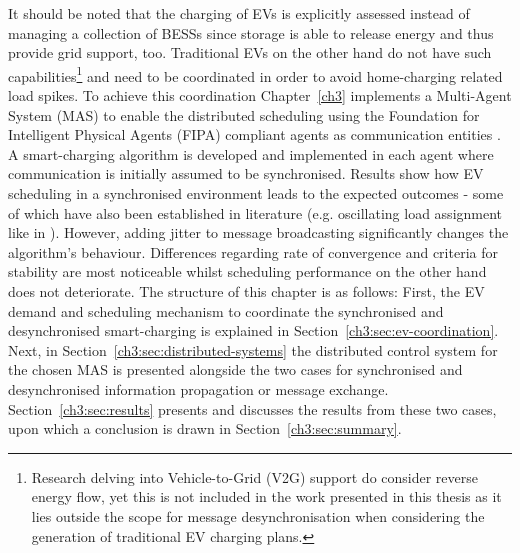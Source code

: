It should be noted that the charging of EVs is explicitly assessed instead of managing a collection of BESSs since storage is able to release energy and thus provide grid support, too.
Traditional EVs on the other hand do not have such capabilities\footnote{Research delving into Vehicle-to-Grid (V2G) support do consider reverse energy flow, yet this is not included in the work presented in this thesis as it lies outside the scope for message desynchronisation when considering the generation of traditional EV charging plans.} and need to be coordinated in order to avoid home-charging related load spikes.
To achieve this coordination Chapter~\ref{ch3} implements a Multi-Agent System (MAS) to enable the distributed scheduling using the Foundation for Intelligent Physical Agents (FIPA) compliant agents as communication entities \cite{FIPA-website}.
A smart-charging algorithm is developed and implemented in each agent where communication is initially assumed to be synchronised.
Results show how EV scheduling in a synchronised environment leads to the expected outcomes - some of which have also been established in literature (e.g. oscillating load assignment like in \cite{Karfopoulos2013}).
However, adding jitter to message broadcasting significantly changes the algorithm's behaviour.
Differences regarding rate of convergence and criteria for stability are most noticeable whilst scheduling performance on the other hand does not deteriorate.
The structure of this chapter is as follows:
First, the EV demand and scheduling mechanism to coordinate the synchronised and desynchronised smart-charging is explained in Section~\ref{ch3:sec:ev-coordination}.
Next, in Section~\ref{ch3:sec:distributed-systems} the distributed control system for the chosen MAS is presented alongside the two cases for synchronised and desynchronised information propagation or message exchange.
Section~\ref{ch3:sec:results} presents and discusses the results from these two cases, upon which a conclusion is drawn in Section~\ref{ch3:sec:summary}.
